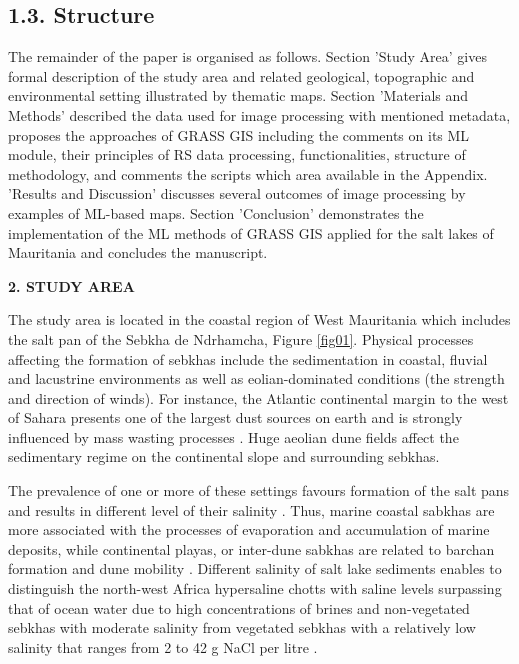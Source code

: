 \documentclass[12pt,a4paper,oneside]{article}
\def \newsection{\vspace{12pt}\textbf}
\def \newpar{\vspace{6pt}}
\begin{document}
\subsection*{1.3. Structure}

\newpar The remainder of the paper is organised as follows. Section 'Study Area' gives formal description of the study area and related geological, topographic and environmental setting illustrated by thematic maps. Section 'Materials and Methods' described the data used for image processing with mentioned metadata, proposes the approaches of GRASS GIS including the comments on its ML module, their principles of RS data processing, functionalities, structure of methodology, and comments the scripts which area available in the Appendix. 'Results and Discussion' discusses several outcomes of image processing by examples of ML-based maps. Section 'Conclusion' demonstrates the implementation of the ML methods of GRASS GIS applied for the salt lakes of Mauritania and concludes the manuscript.

\newsection {2. STUDY AREA}

\newpar The study area is located in the coastal region of West Mauritania which includes the salt pan of the Sebkha de Ndrhamcha, Figure \ref{fig01}. \newpar Physical processes affecting the formation of sebkhas include the sedimentation in coastal, fluvial and lacustrine environments as well as eolian-dominated conditions (the strength and direction of winds). For instance, the Atlantic continental margin to the west of Sahara presents one of the largest dust sources on earth and is strongly influenced by mass wasting processes \citep{HENRICH2010178}. Huge aeolian dune fields affect the sedimentary regime on the continental slope and surrounding sebkhas.

\newpar The prevalence of one or more of these settings favours formation of the salt pans and results in different level of their salinity \citep{TARI2017331}. Thus, marine coastal sabkhas are more associated with the processes of evaporation and accumulation of marine deposits, while continental playas, or inter-dune sabkhas are related to barchan formation and dune mobility \citep{HANDFORD1981255,Ould}. Different salinity of salt lake sediments enables to distinguish the north-west Africa hypersaline chotts with saline levels surpassing that of ocean water due to high concentrations of brines \citep{Lemenkova202313} and non-vegetated sebkhas with moderate salinity \citep{Lemenkova202322} from vegetated sebkhas with a relatively low salinity that ranges from 2 to 42 g NaCl per litre \citep{SOULIEMARSCHE200869}.
\end{document}
